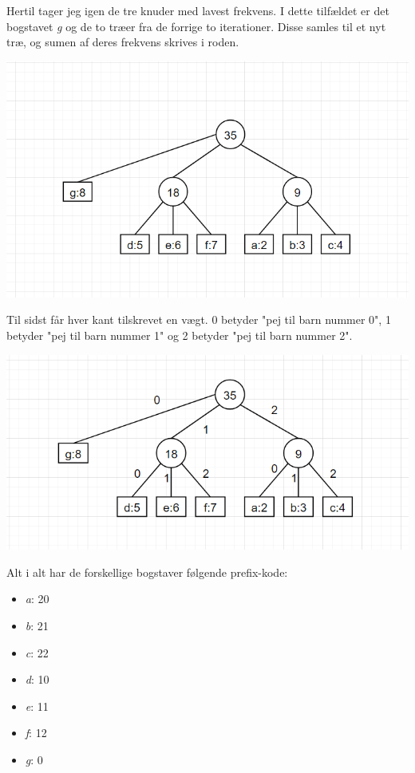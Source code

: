 \documentclass{report}
\begin{document}
Hertil tager jeg igen de tre knuder med lavest frekvens. I dette tilfældet er det bogstavet \textit{g} og de to træer fra de forrige to iterationer. Disse samles til et nyt træ, og sumen af deres frekvens skrives i roden.
\begin{center}
    \includegraphics[height = 5 cm]{../entities/huffman4.PNG}
\end{center}
Til sidst får hver kant tilskrevet en vægt. 0 betyder "pej til barn nummer 0", 1 betyder "pej til barn nummer 1" og 2 betyder "pej til barn nummer 2".
\begin{center}
    \includegraphics[height = 5 cm]{../entities/huffman5.PNG}
\end{center}
Alt i alt har de forskellige bogstaver følgende prefix-kode:
\begin{itemize}
    \item \textit{a}: 20
    \item \textit{b}: 21
    \item \textit{c}: 22
    \item \textit{d}: 10
    \item \textit{e}: 11
    \item \textit{f}: 12
    \item \textit{g}: 0
\end{itemize}
\end{document}
